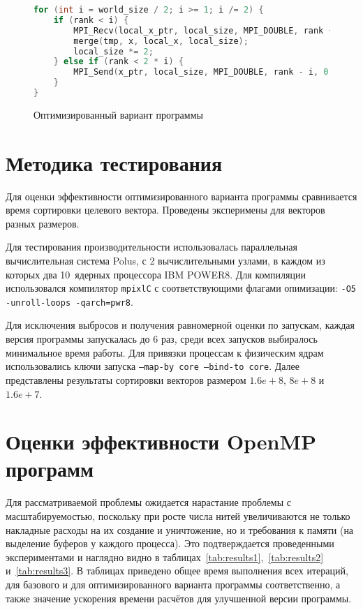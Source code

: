 \documentclass[12pt, oneside, a4paper]{article}
\begin{document}
\begin{figure}[h]
\begin{lstlisting}[language=C++]
for (int i = world_size / 2; i >= 1; i /= 2) {
	if (rank < i) {
		MPI_Recv(local_x_ptr, local_size, MPI_DOUBLE, rank + i, 0, MPI_COMM_WORLD, &Stat);
		merge(tmp, x, local_x, local_size);
		local_size *= 2;
	} else if (rank < 2 * i) {
		MPI_Send(x_ptr, local_size, MPI_DOUBLE, rank - i, 0, MPI_COMM_WORLD);
	}
}
\end{lstlisting}
\caption{Оптимизированный вариант программы}
\label{fig:optimized}
\end{figure}

\section{Методика тестирования}

Для оценки эффективности оптимизированного варианта программы сравнивается время сортировки целевого вектора. Проведены эксперимены для векторов разных размеров.

Для тестирования производительности использовалась параллельная вычислительная система Polus, с 2 вычислительными узлами, в каждом из которых два 10~ядерных процессора IBM POWER8. Для компиляции использовался компилятор \texttt{mpixlC} с соответствующими флагами опимизации: \texttt{-O5 -unroll-loops -qarch=pwr8}.

Для исключения выбросов и получения равномерной оценки по запускам, каждая версия программы запускалась до 6 раз, среди всех запусков выбиралось минимальное время работы. Для привязки процессам к физическим ядрам использовались ключи запуска \texttt{--map-by core --bind-to core}. Далее представлены результаты сортировки векторов размером $1.6e+8$, $8e+8$ и $1.6e+7$.

\section{Оценки эффективности OpenMP программ}

Для рассматриваемой проблемы ожидается нарастание проблемы с масштабируемостью, поскольку при росте числа нитей увеличиваются не только накладные расходы на их создание и уничтожение, но и требования к памяти (на выделение буферов у каждого процесса). Это подтверждается проведенными экспериментами и наглядно видно в таблицах~\ref{tab:results1},~\ref{tab:results2} и~\ref{tab:results3}. В таблицах приведено общее время выполнения всех итераций, для базового и для оптимизированного варианта программы соответственно, а также значение ускорения времени расчётов для улучшенной версии программы.
\end{document}
